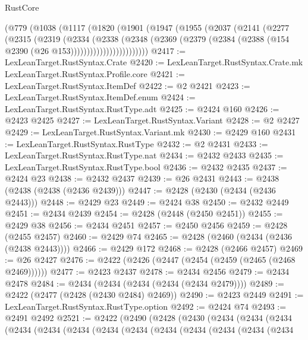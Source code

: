 \begin{lexlean}{RustCore}
\begin{coremodule}
          (@779
            (@1038
              (@1117
                (@1820
                  (@1901
                    (@1947
                      (@1955
                        (@2037
                          (@2141
                            (@2277
                              (@2315
                                (@2319
                                  (@2334
                                    (@2338
                                      (@2348
                                        (@2369
                                          (@2379
                                            (@2384
                                              (@2388 (@154 @2390 (@26 @153))))))))))))))))))))))))
@2417 := LexLeanTarget.RustSyntax.Crate
@2420 := LexLeanTarget.RustSyntax.Crate.mk LexLeanTarget.RustSyntax.Profile.core
@2421 := LexLeanTarget.RustSyntax.ItemDef
@2422 := @2 @2421
@2423 := LexLeanTarget.RustSyntax.ItemDef.enum
@2424 := LexLeanTarget.RustSyntax.RustType.adt
@2425 := @2424 @160
@2426 := @2423 @2425
@2427 := LexLeanTarget.RustSyntax.Variant
@2428 := @2 @2427
@2429 := LexLeanTarget.RustSyntax.Variant.mk
@2430 := @2429 @160
@2431 := LexLeanTarget.RustSyntax.RustType
@2432 := @2 @2431
@2433 := LexLeanTarget.RustSyntax.RustType.nat
@2434 := @2432 @2433
@2435 := LexLeanTarget.RustSyntax.RustType.bool
@2436 := @2432 @2435
@2437 := @2424 @23
@2438 := @2432 @2437
@2439 := @26 @2431
@2443 := @2438 (@2438 (@2438 (@2436 @2439)))
@2447 := @2428 (@2430 (@2434 (@2436 @2443)))
@2448 := @2429 @23
@2449 := @2424 @38
@2450 := @2432 @2449
@2451 := @2434 @2439
@2454 := @2428 (@2448 (@2450 @2451))
@2455 := @2429 @38
@2456 := @2434 @2451
@2457 := @2450 @2456
@2459 := @2428 (@2455 @2457)
@2460 := @2429 @74
@2465 := @2428 (@2460 (@2434 (@2436 (@2438 @2443))))
@2466 := @2429 @172
@2468 := @2428 (@2466 @2457)
@2469 := @26 @2427
@2476 := @2422 (@2426 (@2447 (@2454 (@2459 (@2465 (@2468 @2469))))))
@2477 := @2423 @2437
@2478 := @2434 @2456
@2479 := @2434 @2478
@2484 := @2434 (@2434 (@2434 (@2434 (@2434 @2479))))
@2489 := @2422 (@2477 (@2428 (@2430 @2484) @2469))
@2490 := @2423 @2449
@2491 := LexLeanTarget.RustSyntax.RustType.option
@2492 := @2424 @74
@2493 := @2491 @2492
@2521 := @2422
    (@2490
      (@2428
        (@2430
          (@2434
            (@2434
              (@2434
                (@2434
                  (@2434
                    (@2434
                      (@2434
                        (@2434
                          (@2434
                            (@2434
                              (@2434
                                (@2434
                                  (@2434

\end{coremodule}
\end{lexlean}
